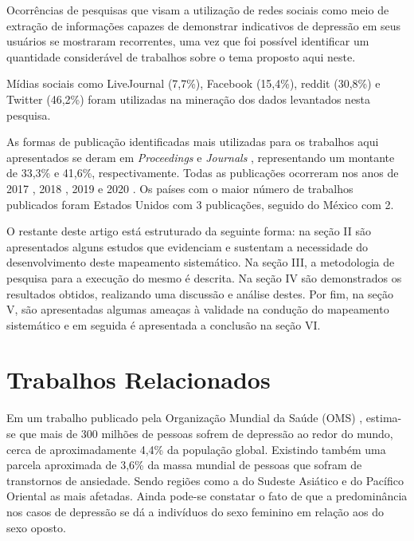 \documentclass[conference]{IEEEtran}
\begin{document}
Ocorrências de pesquisas que visam a utilização de redes sociais como meio de extração de informações capazes de demonstrar indicativos de depressão em seus usuários se mostraram recorrentes, uma vez que foi possível identificar um quantidade considerável de trabalhos sobre o tema proposto aqui neste.

Mídias sociais como LiveJournal \cite{ArtigoN11} (7,7\%), Facebook \cite{ArtigoN3, ArtigoN12} (15,4\%), reddit \cite{ArtigoN1, ArtigoN5, ArtigoN6, ArtigoN10} (30,8\%) e Twitter \cite{ArtigoN2, ArtigoN4, ArtigoN7, ArtigoN8, ArtigoN9, ArtigoN12} (46,2\%) foram utilizadas na mineração dos dados levantados nesta pesquisa.

As formas de publicação identificadas mais utilizadas para os trabalhos aqui apresentados se deram em \textit{Proceedings} \cite{ArtigoN1, ArtigoN6, ArtigoN10, ArtigoN12} e \textit{Journals} \cite{ArtigoN2, ArtigoN3, ArtigoN4, ArtigoN5, ArtigoN11}, representando um montante de 33,3\% e 41,6\%, respectivamente. Todas as publicações ocorreram nos anos de 2017 \cite{ArtigoN7, ArtigoN11, ArtigoN12}, 2018 \cite{ArtigoN5}, 2019 \cite{ArtigoN1, ArtigoN3, ArtigoN9, ArtigoN8} e 2020 \cite{ArtigoN2, ArtigoN4, ArtigoN6, ArtigoN10}. Os países com o maior número de trabalhos publicados foram Estados Unidos \cite{ArtigoN2, ArtigoN7, ArtigoN10} com 3 publicações, seguido do México \cite{ArtigoN1, ArtigoN6} com 2.

O restante deste artigo está estruturado da seguinte forma: na seção II são apresentados alguns estudos que evidenciam e sustentam a necessidade do desenvolvimento deste mapeamento sistemático. Na seção III, a metodologia de pesquisa para a execução do mesmo é descrita. Na seção IV são demonstrados os resultados obtidos, realizando uma discussão e análise destes. Por fim, na seção V, são apresentadas algumas ameaças à validade na condução do mapeamento sistemático e em seguida é apresentada a conclusão na seção VI.

\section{Trabalhos Relacionados}
Em um trabalho publicado pela Organização Mundial da Saúde (OMS) \cite{WHO}, estima-se que mais de 300 milhões de pessoas sofrem de depressão ao redor do mundo, cerca de aproximadamente 4,4\% da população global. Existindo também uma parcela aproximada de 3,6\% da massa mundial de pessoas que sofram de transtornos de ansiedade. Sendo regiões como a do Sudeste Asiático e do Pacífico Oriental as mais afetadas. Ainda pode-se constatar o fato de que a predominância nos casos de depressão se dá a indivíduos do sexo feminino em relação aos do sexo oposto.
\end{document}
